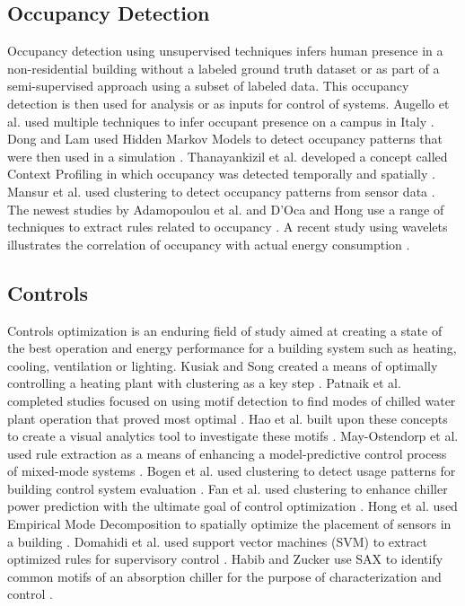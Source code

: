 \subsection{Occupancy Detection}
Occupancy detection using unsupervised techniques infers human presence in a non-residential building without a labeled ground truth dataset or as part of a semi-supervised approach using a subset of labeled data. This occupancy detection is then used for analysis or as inputs for control of systems. Augello et al. used multiple techniques to infer occupant presence on a campus in Italy \citep{augello_sensor_2011}. Dong and Lam used Hidden Markov Models to detect occupancy patterns that were then used in a simulation \citep{dong_building_2011}. Thanayankizil et al. developed a concept called Context Profiling in which occupancy was detected temporally and spatially \citep{thanayankizil_softgreen:_2012}. Mansur et al. used clustering to detect occupancy patterns from sensor data \citep{mansur_learning_2015}. The newest studies by Adamopoulou et al. and D'Oca and Hong use a range of techniques to extract rules related to occupancy \citep{adamopoulou_context-aware_2015,doca_occupancy_2015}. A recent study using wavelets illustrates the correlation of occupancy with actual energy consumption \citep{ahn_correlation_2016}.

\subsection{Controls}
Controls optimization is an enduring field of study aimed at creating a state of the best operation and energy performance for a building system such as heating, cooling, ventilation or lighting. Kusiak and Song created a means of optimally controlling a heating plant with clustering as a key step \citep{kusiak_clustering-based_2008}. Patnaik et al. completed studies focused on using motif detection to find modes of chilled water plant operation that proved most optimal \citep{patnaik_data_2010,patnaik_sustainable_2009}. Hao et al. built upon these concepts to create a visual analytics tool to investigate these motifs \citep{hao_visualizing_2011}. May-Ostendorp et al. used rule extraction as a means of enhancing a model-predictive control process of mixed-mode systems \citep{may-ostendorp_model-predictive_2011,may-ostendorp_extraction_2013}. Bogen et al. used clustering to detect usage patterns for building control system evaluation \citep{bogen_evaluating_2013}. Fan et al. used clustering to enhance chiller power prediction with the ultimate goal of control optimization \citep{fan_prediction_2013}. Hong et al. used Empirical Mode Decomposition to spatially optimize the placement of sensors in a building \citep{hong_towards_2013}. Domahidi et al. used support vector machines (SVM) to extract optimized rules for supervisory control \citep{domahidi_learning_2014}. Habib and Zucker use SAX to identify common motifs of an absorption chiller for the purpose of characterization and control \citep{habib_finding_2015}.

